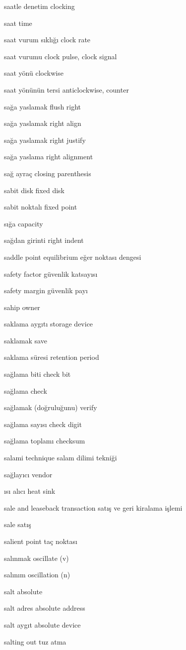 \documentclass[12pt,fleqn]{article}\usepackage{../../common}
\begin{document}
saatle denetim clocking

saat time

saat vurum sıklığı clock rate

saat vurumu clock pulse, clock signal

saat yönü clockwise

saat yönünün tersi anticlockwise, counter

sağa yaslamak flush right

sağa yaslamak right align

sağa yaslamak right justify

sağa yaslama right alignment

sağ ayraç closing parenthesis

sabit disk fixed disk

sabit noktalı fixed point

sığa capacity

sağdan girinti right indent

saddle point equilibrium eğer noktası dengesi

safety factor güvenlik katsayısı

safety margin güvenlik payı

sahip owner

saklama aygıtı storage device

saklamak save

saklama süresi retention period

sağlama biti check bit

sağlama check

sağlamak (doğruluğunu) verify

sağlama sayısı check digit

sağlama toplamı checksum

salami technique salam dilimi tekniği

sağlayıcı vendor

ısı alıcı heat sink

sale and leaseback transaction satış ve geri kiralama işlemi

sale satış

salient point taç noktası

salınmak oscillate (v)

salınım oscillation (n)

salt absolute

salt adres absolute address

salt aygıt absolute device

salting out tuz atma
\end{document}
